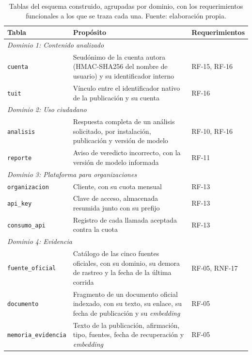 \begin{table}[t]
  \centering
  \small
  \caption{Tablas del esquema construido, agrupadas por dominio, con los requerimientos funcionales a los que se traza cada una. Fuente: elaboración propia.}
  \label{tab:entidades}
  \begin{tabular}{l p{6.4cm} l}
    \hline
    \textbf{Tabla} & \textbf{Propósito} & \textbf{Requerimientos} \\
    \hline
    \multicolumn{3}{l}{\textit{Dominio 1: Contenido analizado}} \\
    \texttt{cuenta} & Seudónimo de la cuenta autora (HMAC-SHA256 del nombre de usuario) y su identificador interno & RF-15, RF-16 \\
    \texttt{tuit} & Vínculo entre el identificador nativo de la publicación y su cuenta & RF-16 \\
    \multicolumn{3}{l}{\textit{Dominio 2: Uso ciudadano}} \\
    \texttt{analisis} & Respuesta completa de un análisis solicitado, por instalación, publicación y versión de modelo & RF-10, RF-16 \\
    \texttt{reporte} & Aviso de veredicto incorrecto, con la versión de modelo informada & RF-11 \\
    \multicolumn{3}{l}{\textit{Dominio 3: Plataforma para organizaciones}} \\
    \texttt{organizacion} & Cliente, con su cuota mensual & RF-13 \\
    \texttt{api\_key} & Clave de acceso, almacenada resumida junto con su prefijo & RF-13 \\
    \texttt{consumo\_api} & Registro de cada llamada aceptada contra la cuota & RF-13 \\
    \multicolumn{3}{l}{\textit{Dominio 4: Evidencia}} \\
    \texttt{fuente\_oficial} & Catálogo de las cinco fuentes oficiales, con su dominio, su demora de rastreo y la fecha de la última corrida & RF-05, RNF-17 \\
    \texttt{documento} & Fragmento de un documento oficial indexado, con su texto, su enlace, su fecha de publicación y su \textit{embedding} & RF-05 \\
    \texttt{memoria\_evidencia} & Texto de la publicación, afirmación, tipo, fuentes, fecha de recuperación y \textit{embedding} & RF-05 \\
    \hline
  \end{tabular}
\end{table}

